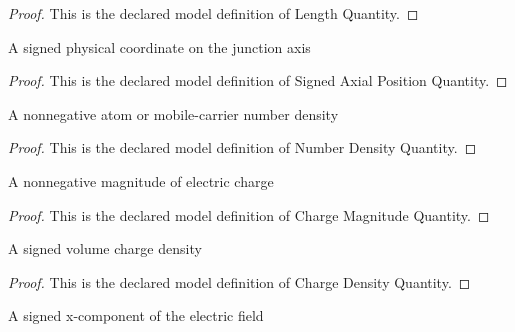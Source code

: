 \begin{proof}
  This is the declared model definition of Length Quantity.
\end{proof}
\begin{definition}
  \label{def:physics:phyx-mini-0630:phyxminiproblems-problemphyxmini0630-signedaxialpositionquantity}
  A signed physical coordinate on the junction axis
\end{definition}
\begin{proof}
  This is the declared model definition of Signed Axial Position Quantity.
\end{proof}
\begin{definition}
  \label{def:physics:phyx-mini-0630:phyxminiproblems-problemphyxmini0630-numberdensityquantity}
  A nonnegative atom or mobile-carrier number density
\end{definition}
\begin{proof}
  This is the declared model definition of Number Density Quantity.
\end{proof}
\begin{definition}
  \label{def:physics:phyx-mini-0630:phyxminiproblems-problemphyxmini0630-chargemagnitudequantity}
  A nonnegative magnitude of electric charge
\end{definition}
\begin{proof}
  This is the declared model definition of Charge Magnitude Quantity.
\end{proof}
\begin{definition}
  \label{def:physics:phyx-mini-0630:phyxminiproblems-problemphyxmini0630-chargedensityquantity}
  A signed volume charge density
\end{definition}
\begin{proof}
  This is the declared model definition of Charge Density Quantity.
\end{proof}
\begin{definition}
  \label{def:physics:phyx-mini-0630:phyxminiproblems-problemphyxmini0630-axialelectricfieldquantity}
  A signed x-component of the electric field
\end{definition}
